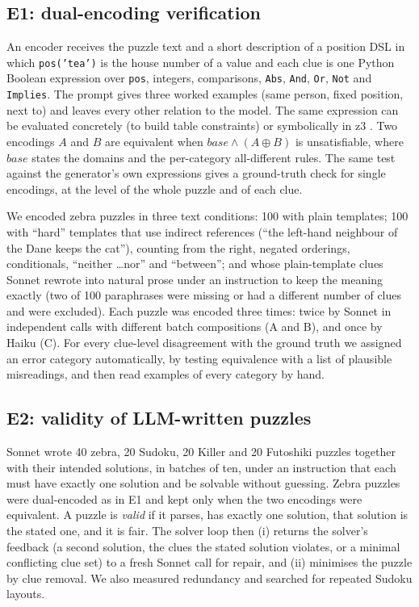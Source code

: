 \subsection{E1: dual-encoding verification}

An encoder receives the puzzle text and a short description of a position DSL in which \texttt{pos('tea')} is the house number of a value and each clue is one Python Boolean expression over \texttt{pos}, integers, comparisons, \texttt{Abs}, \texttt{And}, \texttt{Or}, \texttt{Not} and \texttt{Implies}. The prompt gives three worked examples (same person, fixed position, next to) and leaves every other relation to the model. The same expression can be evaluated concretely (to build table constraints) or symbolically in z3 \citep{demoura2008z3}. Two encodings $A$ and $B$ are equivalent when $\mathit{base} \wedge (A \oplus B)$ is unsatisfiable, where $\mathit{base}$ states the domains and the per-category all-different rules. The same test against the generator's own expressions gives a ground-truth check for single encodings, at the level of the whole puzzle and of each clue.

We encoded \EOneN zebra puzzles in three text conditions: 100 with plain templates; 100 with ``hard'' templates that use indirect references (``the left-hand neighbour of the Dane keeps the cat''), counting from the right, negated orderings, conditionals, ``neither \ldots nor'' and ``between''; and \EOneParaN whose plain-template clues Sonnet rewrote into natural prose under an instruction to keep the meaning exactly (two of 100 paraphrases were missing or had a different number of clues and were excluded). Each puzzle was encoded three times: twice by Sonnet in independent calls with different batch compositions (A and B), and once by Haiku (C). For every clue-level disagreement with the ground truth we assigned an error category automatically, by testing equivalence with a list of plausible misreadings, and then read examples of every category by hand.

\subsection{E2: validity of LLM-written puzzles}

Sonnet wrote 40 zebra, 20 Sudoku, 20 Killer and 20 Futoshiki puzzles together with their intended solutions, in batches of ten, under an instruction that each must have exactly one solution and be solvable without guessing. Zebra puzzles were dual-encoded as in E1 and kept only when the two encodings were equivalent. A puzzle is \emph{valid} if it parses, has exactly one solution, that solution is the stated one, and it is fair. The solver loop then (i) returns the solver's feedback (a second solution, the clues the stated solution violates, or a minimal conflicting clue set) to a fresh Sonnet call for repair, and (ii) minimises the puzzle by clue removal. We also measured redundancy and searched for repeated Sudoku layouts.

